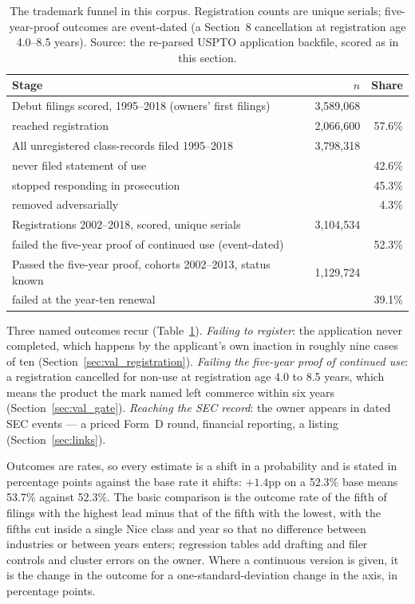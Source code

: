 \begin{table}[!htbp]\centering\small
\caption{The trademark funnel in this corpus. Registration counts are
unique serials; five-year-proof outcomes are event-dated (a Section~8
cancellation at registration age 4.0--8.5 years). Source: the re-parsed
USPTO application backfile, scored as in this section.}
\label{tab:funnel}
\begin{tabular}{lrr}
\toprule
Stage & $n$ & Share \\
\midrule
Debut filings scored, 1995--2018 (owners' first filings) & 3{,}589{,}068 & \\
\quad reached registration & 2{,}066{,}600 & 57.6\% \\
\midrule
All unregistered class-records filed 1995--2018 & 3{,}798{,}318 & \\
\quad never filed statement of use & & 42.6\% \\
\quad stopped responding in prosecution & & 45.3\% \\
\quad removed adversarially & & 4.3\% \\
\midrule
Registrations 2002--2018, scored, unique serials & 3{,}104{,}534 & \\
\quad failed the five-year proof of continued use (event-dated) & & 52.3\% \\
\midrule
Passed the five-year proof, cohorts 2002--2013, status known & 1{,}129{,}724 & \\
\quad failed at the year-ten renewal & & 39.1\% \\
\bottomrule
\end{tabular}
\end{table}

Three named outcomes recur (Table~\ref{tab:funnel}). \emph{Failing to
register}: the application never completed, which happens by the
applicant's own inaction in roughly nine cases of ten
(Section~\ref{sec:val_registration}). \emph{Failing the five-year proof of
continued use}: a registration cancelled for non-use at registration age
4.0 to 8.5 years, which means the product the mark named left commerce
within six years (Section~\ref{sec:val_gate}).
\emph{Reaching the SEC record}: the owner appears in dated SEC events ---
a priced Form~D round, financial reporting, a listing
(Section~\ref{sec:links}).

Outcomes are rates, so every estimate is a shift in a probability and is
stated in percentage points against the base rate it shifts: $+1.4$pp on
a 52.3\% base means 53.7\% against 52.3\%. The basic comparison is the
outcome rate of the fifth of filings with the highest lead minus that of
the fifth with the lowest, with the fifths cut inside a single Nice class
and year so that no difference between industries or between years
enters; regression tables add drafting and filer controls and cluster
errors on the owner. Where a continuous version is given, it is the
change in the outcome for a one-standard-deviation change in the axis, in
percentage points.

